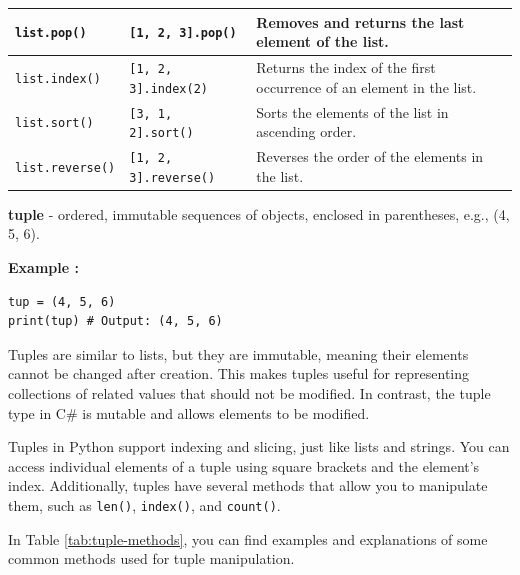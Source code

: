 \documentclass[12pt]{book}
\newtheorem{Example}{Example}[chapter]
\renewenvironment{Example}{\begin{trivlist}\item\relax
\textbf{Example \thesection: }}{\end{trivlist}}
\begin{document}
\begin{itemize}
\begin{table}[h]
\begin{tabular}{|l|l|p{7cm}|}
\hline
\texttt{list.pop()} & \texttt{[1, 2, 3].pop()} & Removes and returns the last element of the list. \\
\hline
\texttt{list.index()} & \texttt{[1, 2, 3].index(2)} & Returns the index of the first occurrence of an element in the list. \\
\hline
\texttt{list.sort()} & \texttt{[3, 1, 2].sort()} & Sorts the elements of the list in ascending order. \\
\hline
\texttt{list.reverse()} & \texttt{[1, 2, 3].reverse()} & Reverses the order of the elements in the list. \\
\hline
\end{tabular}
\end{table}


\item \textbf{tuple} - ordered, immutable sequences of objects, enclosed in parentheses, e.g., (4, 5, 6).
\begin{Example}
\begin{lstlisting}
tup = (4, 5, 6)
print(tup) # Output: (4, 5, 6)
\end{lstlisting}
\end{Example}

Tuples are similar to lists, but they are immutable, meaning their elements cannot be changed after creation. This makes tuples useful for representing collections of related values that should not be modified. In contrast, the tuple type in C\# is mutable and allows elements to be modified.

Tuples in Python support indexing and slicing, just like lists and strings. You can access individual elements of a tuple using square brackets and the element's index. Additionally, tuples have several methods that allow you to manipulate them, such as \texttt{len()}, \texttt{index()}, and \texttt{count()}.

In Table \ref{tab:tuple-methods}, you can find examples and explanations of some common methods used for tuple manipulation.
\end{itemize}
\end{document}
